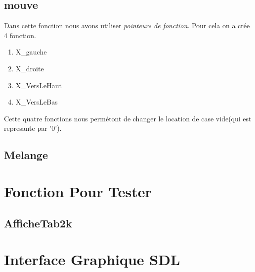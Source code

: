 \documentclass{article}
\begin{document}
\subsection{mouve}
Dans cette fonction nous avons utiliser \textit{pointeurs de fonction}. Pour cela on a crée 4 fonction.	

\begin{enumerate}
	\item X\_gauche 			
	\item X\_droite 			
	\item X\_VersLeHaut		
	\item X\_VersLeBas		
\end{enumerate}

Cette quatre fonctions nous permétont de changer le location de case vide(qui est represante par '0'). 
	

\subsection{Melange}

\section{Fonction Pour Tester}

\subsection{AfficheTab2k}


\section{Interface Graphique SDL}
\end{document}
